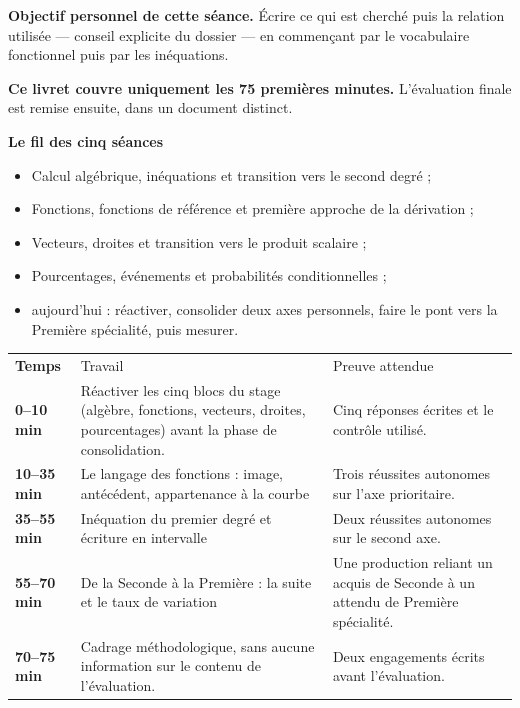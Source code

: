 \documentclass[10pt,a4paper]{article}
\begin{document}
\begin{goalbox}
\textbf{Objectif personnel de cette séance.} Écrire ce qui est cherché puis la relation utilisée — conseil explicite du dossier — en commençant par le vocabulaire fonctionnel puis par les inéquations.
\par\medskip
\textbf{Ce livret couvre uniquement les 75 premières minutes.} L'évaluation finale est remise ensuite, dans un document distinct.
\end{goalbox}
\begin{methodbox}
\textbf{Le fil des cinq séances}
\begin{itemize}[leftmargin=13mm,labelsep=3mm,itemsep=1.5pt]
\item[\textbf{\color{Navy}S1}] Calcul algébrique, inéquations et transition vers le second degré ;
\item[\textbf{\color{Navy}S2}] Fonctions, fonctions de référence et première approche de la dérivation ;
\item[\textbf{\color{Navy}S3}] Vecteurs, droites et transition vers le produit scalaire ;
\item[\textbf{\color{Navy}S4}] Pourcentages, événements et probabilités conditionnelles ;
\item[\textbf{\color{Navy}S5}] aujourd'hui : réactiver, consolider deux axes personnels, faire le pont vers la Première spécialité, puis mesurer.
\end{itemize}
\end{methodbox}
\par\noindent\begin{tabularx}{\linewidth}{>{\bfseries}p{20mm} X X}
\rowcolor{Navy}\color{white}Temps & \color{white}Travail & \color{white}Preuve attendue \\
0--10 min & Réactiver les cinq blocs du stage (algèbre, fonctions, vecteurs, droites, pourcentages) avant la phase de consolidation. & Cinq réponses écrites et le contrôle utilisé. \\
10--35 min & Le langage des fonctions : image, antécédent, appartenance à la courbe & Trois réussites autonomes sur l'axe prioritaire. \\
35--55 min & Inéquation du premier degré et écriture en intervalle & Deux réussites autonomes sur le second axe. \\
55--70 min & De la Seconde à la Première : la suite et le taux de variation & Une production reliant un acquis de Seconde à un attendu de Première spécialité. \\
70--75 min & Cadrage méthodologique, sans aucune information sur le contenu de l'évaluation. & Deux engagements écrits avant l'évaluation. \\
\end{tabularx}
\end{document}
